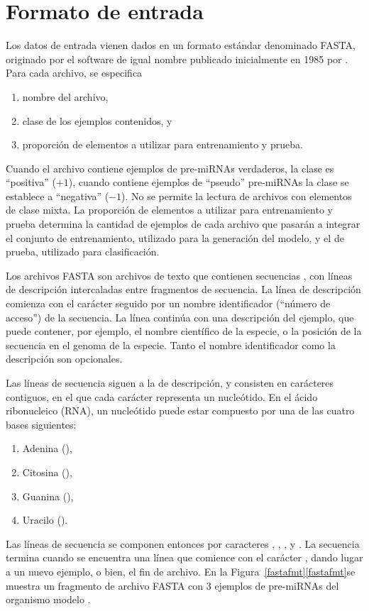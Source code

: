 %
%
%
\section{Formato de entrada}
%
Los datos de entrada vienen dados en un formato estándar denominado
FASTA, originado por el software de igual nombre publicado
inicialmente en 1985 por \citeauthor{fasta} \cite{fasta}.  Para cada
archivo, se especifica
%
\begin{enumerate}
\item nombre del archivo,
\item clase de los ejemplos contenidos, y
\item proporción de elementos a utilizar para entrenamiento y prueba.
\end{enumerate}
%
Cuando el archivo contiene ejemplos de pre-miRNAs verdaderos, la clase
es ``positiva'' ($+1$), cuando contiene ejemplos de ``pseudo''
pre-miRNAs la clase se establece a ``negativa'' ($-1$).  No se permite
la lectura de archivos con elementos de clase mixta.  La proporción de
elementos a utilizar para entrenamiento y prueba determina la cantidad
de ejemplos de cada archivo que pasarán a integrar el conjunto de
entrenamiento, utilizado para la generación del modelo, y el de
prueba, utilizado para clasificación.

Los archivos FASTA son archivos de texto que contienen secuencias
, con líneas de descripción intercaladas entre fragmentos
de secuencia.
La línea de descripción comienza con el carácter \mono{>} seguido por
un nombre identificador (``número de acceso'') de la secuencia.  La
línea continúa con una descripción del ejemplo, que
puede contener, por ejemplo, el nombre científico de la especie, o la
posición de la secuencia en el genoma de la especie. Tanto el nombre
identificador como la descripción son opcionales.

Las líneas de secuencia siguen a la de descripción, y consisten en
carácteres contiguos, en el que cada carácter representa un
nucleótido. En el ácido ribonucleico (RNA), un nucleótido puede estar
compuesto por una de las cuatro bases siguientes:
%
\begin{enumerate}
\item Adenina (),
\item Citosina (),
\item Guanina (),
\item Uracilo ().
\end{enumerate}
%
Las líneas de secuencia se componen entonces por caracteres ,
, , y .  La secuencia termina cuando se
encuentra una línea que comience con el carácter \mono{>}, dando lugar
a un nuevo ejemplo, o bien, el fin de archivo.
En la \iflatexml{}Figura~\ref{fastafmt}\else\autoref{fastafmt}\fi se
muestra un fragmento de archivo FASTA
con 3 ejemplos de pre-miRNAs del organismo modelo .
